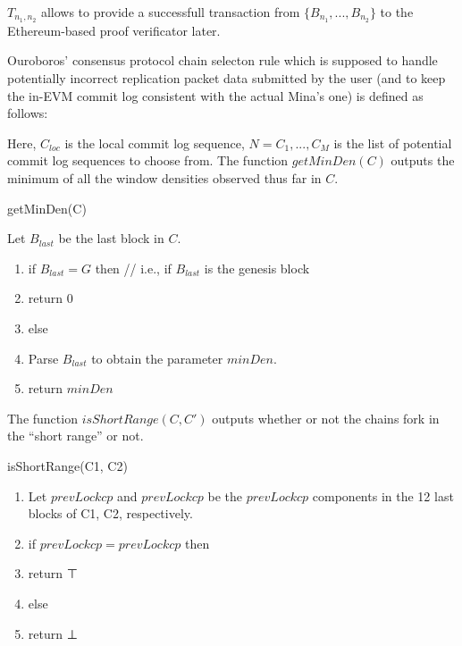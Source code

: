 $T_{n_1, n_2}$ allows to provide a successfull transaction from $\{B_{n_1}, ..., B_{n_2}\}$ to the Ethereum-based proof verificator later. 

Ouroboros' consensus protocol chain selecton rule which is supposed to handle
potentially incorrect replication packet data submitted by the user (and to keep
the in-EVM commit log consistent with the actual Mina's one) is defined as
follows:

Here, $C_{loc}$ is the local commit log sequence, $N = {C_1, ... ,C_M}$ is the list 
of potential commit log sequences to choose from. 
The function $getMinDen(C)$ outputs the minimum of all the window densities
observed thus far in $C$.

\begin{algorithm}[H]
    \caption{getMinDen(C)}
    Let $B_{last}$ be the last block in $C$.
    \begin{enumerate}
        \item if $B_{last} = G$ then // i.e., if $B_{last}$ is the genesis block 
        \item return $0$
        \item else
        \item Parse $B_{last}$ to obtain the parameter $minDen$. 
        \item return $minDen$
    \end{enumerate}
\end{algorithm}

The function $isShortRange(C,C′)$ outputs whether or not the chains fork in the “short range” or not. 

\begin{algorithm}[H]
    \caption{isShortRange(C1, C2)}
    \begin{enumerate}
        \item Let $prevLockcp$ and $prevLockcp$ be the $prevLockcp$ components in the 12 last blocks of C1, C2, respectively. 
        \item if $prevLockcp = prevLockcp$ then
        \item return ⊤
        \item else
        \item return ⊥
    \end{enumerate}
\end{algorithm}

